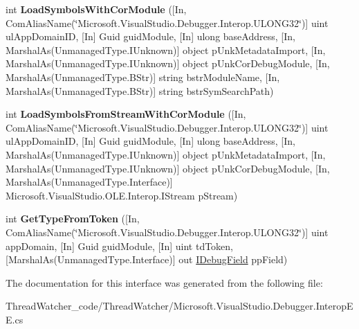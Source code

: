 \begin{DoxyCompactItemize}
\item 
\hypertarget{interface_microsoft_1_1_visual_studio_1_1_debugger_1_1_interop_e_e_1_1_i_debug_com_plus_symbol_provider2_a689f81a70bc156e0ee2cbabae108cb4c}{int {\bfseries Load\+Symbols\+With\+Cor\+Module} (\mbox{[}In, Com\+Alias\+Name(\char`\"{}Microsoft.\+Visual\+Studio.\+Debugger.\+Interop.\+U\+L\+O\+N\+G32\char`\"{})\mbox{]} uint ul\+App\+Domain\+I\+D, \mbox{[}In\mbox{]} Guid guid\+Module, \mbox{[}In\mbox{]} ulong base\+Address, \mbox{[}In, Marshal\+As(Unmanaged\+Type.\+I\+Unknown)\mbox{]} object p\+Unk\+Metadata\+Import, \mbox{[}In, Marshal\+As(Unmanaged\+Type.\+I\+Unknown)\mbox{]} object p\+Unk\+Cor\+Debug\+Module, \mbox{[}In, Marshal\+As(Unmanaged\+Type.\+B\+Str)\mbox{]} string bstr\+Module\+Name, \mbox{[}In, Marshal\+As(Unmanaged\+Type.\+B\+Str)\mbox{]} string bstr\+Sym\+Search\+Path)}\label{interface_microsoft_1_1_visual_studio_1_1_debugger_1_1_interop_e_e_1_1_i_debug_com_plus_symbol_provider2_a689f81a70bc156e0ee2cbabae108cb4c}

\item 
\hypertarget{interface_microsoft_1_1_visual_studio_1_1_debugger_1_1_interop_e_e_1_1_i_debug_com_plus_symbol_provider2_a6d6f427084513a33649498c41c5adf52}{int {\bfseries Load\+Symbols\+From\+Stream\+With\+Cor\+Module} (\mbox{[}In, Com\+Alias\+Name(\char`\"{}Microsoft.\+Visual\+Studio.\+Debugger.\+Interop.\+U\+L\+O\+N\+G32\char`\"{})\mbox{]} uint ul\+App\+Domain\+I\+D, \mbox{[}In\mbox{]} Guid guid\+Module, \mbox{[}In\mbox{]} ulong base\+Address, \mbox{[}In, Marshal\+As(Unmanaged\+Type.\+I\+Unknown)\mbox{]} object p\+Unk\+Metadata\+Import, \mbox{[}In, Marshal\+As(Unmanaged\+Type.\+I\+Unknown)\mbox{]} object p\+Unk\+Cor\+Debug\+Module, \mbox{[}In, Marshal\+As(Unmanaged\+Type.\+Interface)\mbox{]} Microsoft.\+Visual\+Studio.\+O\+L\+E.\+Interop.\+I\+Stream p\+Stream)}\label{interface_microsoft_1_1_visual_studio_1_1_debugger_1_1_interop_e_e_1_1_i_debug_com_plus_symbol_provider2_a6d6f427084513a33649498c41c5adf52}

\item 
\hypertarget{interface_microsoft_1_1_visual_studio_1_1_debugger_1_1_interop_e_e_1_1_i_debug_com_plus_symbol_provider2_aeb3118e996a657782c1969347601a3e6}{int {\bfseries Get\+Type\+From\+Token} (\mbox{[}In, Com\+Alias\+Name(\char`\"{}Microsoft.\+Visual\+Studio.\+Debugger.\+Interop.\+U\+L\+O\+N\+G32\char`\"{})\mbox{]} uint app\+Domain, \mbox{[}In\mbox{]} Guid guid\+Module, \mbox{[}In\mbox{]} uint td\+Token, \mbox{[}Marshal\+As(Unmanaged\+Type.\+Interface)\mbox{]} out \hyperlink{interface_microsoft_1_1_visual_studio_1_1_debugger_1_1_interop_e_e_1_1_i_debug_field}{I\+Debug\+Field} pp\+Field)}\label{interface_microsoft_1_1_visual_studio_1_1_debugger_1_1_interop_e_e_1_1_i_debug_com_plus_symbol_provider2_aeb3118e996a657782c1969347601a3e6}

\end{DoxyCompactItemize}


The documentation for this interface was generated from the following file\+:\begin{DoxyCompactItemize}
\item 
Thread\+Watcher\+\_\+code/\+Thread\+Watcher/Microsoft.\+Visual\+Studio.\+Debugger.\+Interop\+E\+E.\+cs\end{DoxyCompactItemize}

